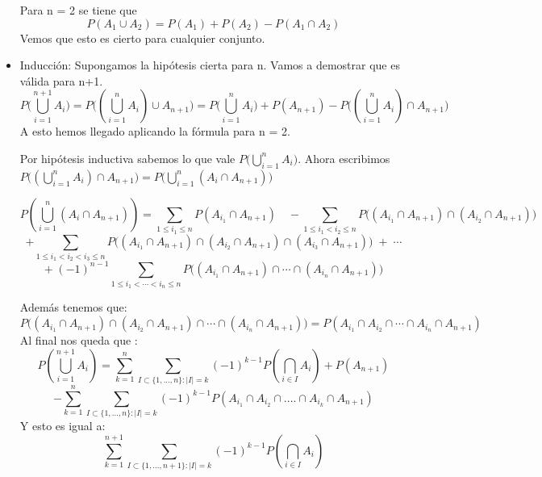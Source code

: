 \begin{problem}[10]
\begin{itemize}
        Para n = 2 se tiene que $$P(A_1\cup A_2)=P(A_1)+P(A_2)-P(A_1\cap
A_2)$$ Vemos que esto es cierto para cualquier conjunto.

        \item Inducción:
        Supongamos la hipótesis cierta para n. Vamos a demostrar que es
válida para n+1.
        $${P\big(\bigcup_{i=1}^{n+1}A_i\big)=P\big((\bigcup_{i=1}^nA_i)\cup A_{n+1}\big)=P\big(\bigcup_{i=1}^nA_i\big)+P(A_{n+1})-P\big((\bigcup_{i=1}^nA_i)\cap
A_{n+1}\big)}$$
        A esto hemos llegado aplicando la fórmula para n = 2.

        Por hipótesis inductiva sabemos lo que vale $P\big(\bigcup_{i=1}^nA_i\big)$.
        Ahora escribimos $P\big((\bigcup_{i=1}^nA_i)\cap
A_{n+1}\big)=P\big(\bigcup_{i=1}^n(A_i\cap A_{n+1})\big)$

        $$P(\bigcup_{i=1}^n(A_i\cap A_{n+1}))=\sum_{1\leq i_1\leq
n}P(A_{i_1}\cap A_{n+1})\quad -\sum_{1\leq i_1<i_2\leq
n}P\big((A_{i_1}\cap A_{n+1})\cap (A_{i_2}\cap A_{n+1})\big)\quad
$$$$+\sum_{1\leq i_1<i_2<i_3\leq n}P\big((A_{i_1}\cap A_{n+1})\cap
(A_{i_2}\cap A_{n+1})\cap (A_{i_3}\cap
A_{n+1})\big)\;+\;\cdots$$$$+\;(-1)^{n-1}\sum_{1\leq
i_1<\cdots<i_n\leq n}P\big((A_{i_1}\cap A_{n+1})\cap \cdots \cap
(A_{i_n}\cap A_{n+1})\big)$$

        Además tenemos que:
        $$ P\big((A_{i_1}\cap A_{n+1})\cap(A_{i_2}\cap A_{n+1})\cap \cdots
\cap (A_{i_n}\cap A_{n+1})\big)=P(A_{i_1}\cap A_{i_2}\cap\cdots\cap
A_{i_n}\cap A_{n+1})$$
        Al final nos queda que :
        $$P(\bigcup_{i=1}^{n+1}A_i) = \sum_{k=1}^{n}\sum_{I\subset
\{1,...,n\}:|I|=k}(-1)^{k-1}P(\bigcap_{i\in I}A_i) + P(A_{n+1})$$$$ -
\sum_{k=1}^{n}\sum_{I\subset \{1,...,n\}:|I|=k}(-1)^{k-1}P(A_{i_1}
\cap A_{i_2} \cap .... \cap A_{i_k} \cap A_{n+1})$$
        Y esto es igual a:
        $$\sum_{k=1}^{n+1}\sum_{I\subset
\{1,...,n+1\}:|I|=k}(-1)^{k-1}P(\bigcap_{i\in I}A_i)$$
\end{itemize}

\end{problem}


